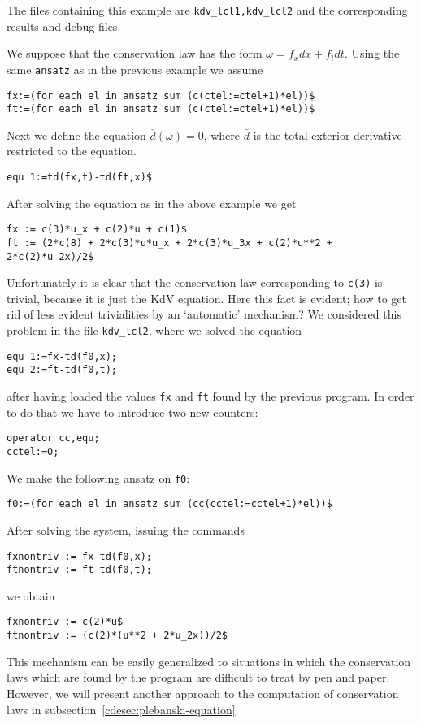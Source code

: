 The files containing this example are \texttt{kdv\_lcl1,kdv\_lcl2}
and the corresponding results and debug files.

We suppose that the conservation law has the form $\omega=f_x dx+f_t dt$.
Using the same \texttt{ansatz} as in the previous example we assume
\begin{verbatim}
fx:=(for each el in ansatz sum (c(ctel:=ctel+1)*el))$
ft:=(for each el in ansatz sum (c(ctel:=ctel+1)*el))$
\end{verbatim}
Next we define the equation $\bar d(\omega)=0$, where $\bar d$ is the total
exterior derivative restricted to the equation.
\begin{verbatim}
equ 1:=td(fx,t)-td(ft,x)$
\end{verbatim}

After solving the equation as in the above example we get
\begin{verbatim}
fx := c(3)*u_x + c(2)*u + c(1)$
ft := (2*c(8) + 2*c(3)*u*u_x + 2*c(3)*u_3x + c(2)*u**2 +
2*c(2)*u_2x)/2$
\end{verbatim}
Unfortunately it is clear that the conservation law corresponding to
\texttt{c(3)} is trivial, because it is just the KdV equation. Here this fact
is evident; how to get rid of less evident trivialities by an `automatic'
mechanism? We considered this problem in the file \texttt{kdv\_lcl2},
where we solved the equation
\begin{verbatim}
equ 1:=fx-td(f0,x);
equ 2:=ft-td(f0,t);
\end{verbatim}
after having loaded the values \texttt{fx} and \texttt{ft} found by the
previous program. In order to do that we have to introduce two new counters:
\begin{verbatim}
operator cc,equ;
cctel:=0;
\end{verbatim}
We make the following ansatz on \texttt{f0}:
\begin{verbatim}
f0:=(for each el in ansatz sum (cc(cctel:=cctel+1)*el))$
\end{verbatim}
After solving the system, issuing the commands
\begin{verbatim}
fxnontriv := fx-td(f0,x);
ftnontriv := ft-td(f0,t);
\end{verbatim}
we obtain
\begin{verbatim}
fxnontriv := c(2)*u$
ftnontriv := (c(2)*(u**2 + 2*u_2x))/2$
\end{verbatim}
This mechanism can be easily generalized to situations in which the
conservation laws which are found by the program are difficult to treat by pen
and paper. However, we will present another approach to the computation of
conservation laws in subsection~\ref{cdesec:plebanski-equation}.

